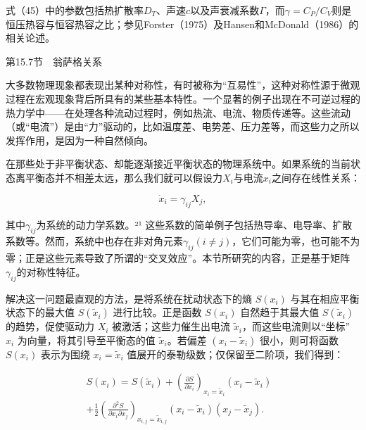 式（45）中的参数包括热扩散率\(D_{T}\)、声速\(c\)以及声衰减系数\(\Gamma\)，而\(\gamma = C_{P}/C_{V}\)则是恒压热容与恒容热容之比；参见Forster（1975）及Hansen和McDonald（1986）的相关论述。

第15.7节　翁萨格关系

大多数物理现象都表现出某种对称性，有时被称为``互易性''，这种对称性源于微观过程在宏观现象背后所具有的某些基本特性。一个显著的例子出现在不可逆过程的热力学中------在处理各种流动过程时，例如热流、电流、物质传递等。这些流动（或``电流''）是由``力''驱动的，比如温度差、电势差、压力差等，而这些力之所以发挥作用，是因为一种自然倾向。

在那些处于非平衡状态、却能逐渐接近平衡状态的物理系统中。如果系统的当前状态离平衡态并不相差太远，那么我们就可以假设力\(X_i\)与电流\(x_i\)之间存在线性关系：

\begin{equation}\tag{15.6.27}\label{eq:15.6.27}
\dot { x } _ { i } = \gamma _ { i j } X _ { j } ,
\end{equation}

其中\(\gamma_{ij}\)为系统的动力学系数。²¹ 这些系数的简单例子包括热导率、电导率、扩散系数等。然而，系统中也存在非对角元素\(\gamma_{ij}(i \neq j)\)，它们可能为零，也可能不为零；正是这些元素导致了所谓的``交叉效应''。本节所研究的内容，正是基于矩阵\(\gamma_{ij}\)的对称性特征。

解决这一问题最直观的方法，是将系统在扰动状态下的熵 \(S(x_i)\) 与其在相应平衡状态下的最大值 \(S(\tilde{x}_i)\) 进行比较。正是函数 \(S(x_i)\) 自然趋于其最大值 \(S(\tilde{x}_i)\) 的趋势，促使驱动力 \(X_i\) 被激活；这些力催生出电流 \(\tilde{x}_i\)，而这些电流则以``坐标'' \(x_i\) 为向量，将其引导至平衡态的值 \(\tilde{x}_i\)。若偏差 \((x_i - \tilde{x}_i)\) 很小，则可将函数 \(S(x_i)\) 表示为围绕 \(x_i = \tilde{x}_i\) 值展开的泰勒级数；仅保留至二阶项，我们得到：

\begin{equation}\tag{15.6.28}\label{eq:15.6.28}
\begin{array}{rl} { S ( x _ { i } ) = S ( \tilde { x } _ { i } ) + \left( \frac { \partial S } { \partial x _ { i } } \right) _ { x _ { i } = \tilde { x } _ { i } } ( x _ { i } - \tilde { x } _ { i } ) } & { } \\{ + \frac { 1 } { 2 } \left( \frac { \partial ^{2} S } { \partial x _ { i } \partial x _ { j } } \right) _ { x _ { i , j } = \tilde { x } _ { i , j } } ( x _ { i } - \tilde { x } _ { i } ) ( x _ { j } - \tilde { x } _ { j } ) . } & { } \end{array}
\end{equation}

